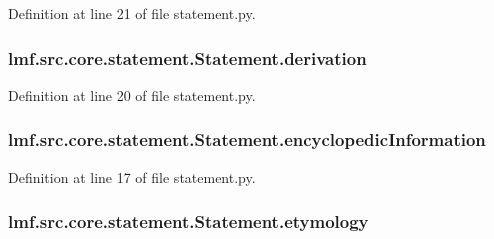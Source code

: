 Definition at line 21 of file statement.\+py.

\hypertarget{classlmf_1_1src_1_1core_1_1statement_1_1_statement_afa73464513552afc8a6bf3828446a7d9}{
\subsubsection[{derivation}]{\setlength{\rightskip}{0pt plus 5cm}lmf.\+src.\+core.\+statement.\+Statement.\+derivation}}\label{classlmf_1_1src_1_1core_1_1statement_1_1_statement_afa73464513552afc8a6bf3828446a7d9}


Definition at line 20 of file statement.\+py.

\hypertarget{classlmf_1_1src_1_1core_1_1statement_1_1_statement_a3f6a8d066930ce775d6f6655ea5f3dfa}{
\subsubsection[{encyclopedic\+Information}]{\setlength{\rightskip}{0pt plus 5cm}lmf.\+src.\+core.\+statement.\+Statement.\+encyclopedic\+Information}}\label{classlmf_1_1src_1_1core_1_1statement_1_1_statement_a3f6a8d066930ce775d6f6655ea5f3dfa}


Definition at line 17 of file statement.\+py.

\hypertarget{classlmf_1_1src_1_1core_1_1statement_1_1_statement_a1232c0098a52fa5f72d6a80c8661152a}{
\subsubsection[{etymology}]{\setlength{\rightskip}{0pt plus 5cm}lmf.\+src.\+core.\+statement.\+Statement.\+etymology}}\label{classlmf_1_1src_1_1core_1_1statement_1_1_statement_a1232c0098a52fa5f72d6a80c8661152a}



